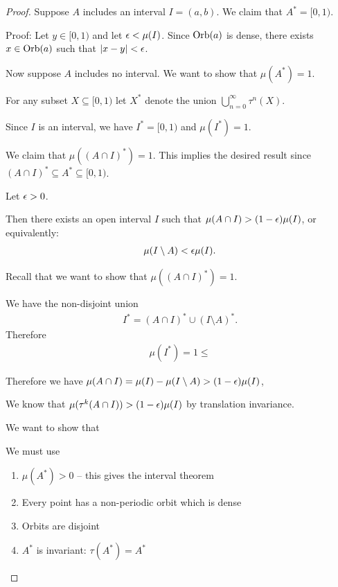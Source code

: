 \begin{enumerate}
\begin{proof}
    Suppose $A$ includes an interval $I = (a, b)$. We claim that $A^* = [0, 1)$.

    Proof: Let $y \in [0, 1)$ and let $\epsilon < \mu(I)$. Since $\text{Orb}(a)$ is dense, there exists $x \in \text{Orb}(a)$
    such that $|x - y| < \epsilon$.


    Now suppose $A$ includes no interval. We want to show that $\mu(A^*) = 1$.

    For any subset $X \subseteq [0, 1)$ let $X^*$ denote the union $\bigcup_{n=0}^\infty \tau^n(X)$.

    Since $I$ is an interval, we have $I^* = [0, 1)$ and $\mu(I^*) = 1$.

    We claim that $\mu((A \cap I)^*) = 1$. This implies the desired result
    since $(A \cap I)^* \subseteq A^* \subseteq [0, 1)$.

    Let $\epsilon > 0$.

    Then there exists an open interval $I$ such that $\mu(A \cap I) > (1 - \epsilon) \mu(I)$, or equivalently:
    \begin{align*}
      \mu(I \setminus A) < \epsilon\mu(I).
    \end{align*}

    Recall that we want to show that $\mu((A \cap I)^*) = 1$.

    We have the non-disjoint union
    \begin{align*}
      I^* = (A \cap I)^* \cup (I \setminus A)^*.
    \end{align*}
    Therefore
    \begin{align*}
      \mu(I^*) = 1 \leq
    \end{align*}



    Therefore we have $\mu(A \cap I) = \mu(I) - \mu(I \setminus A) > (1 - \epsilon)\mu(I)$,




    We know that $\mu(\tau^k(A \cap I)) > (1 - \epsilon)\mu(I)$ by translation invariance.






    We want to show that

    We must use
    \begin{enumerate}
    \item $\mu(A^*) > 0$ -- this gives the interval theorem
    \item Every point has a non-periodic orbit which is dense
    \item Orbits are disjoint
    \item $A^*$ is invariant: $\tau(A^*) = A^*$
    \end{enumerate}


\end{proof}
\end{enumerate}
